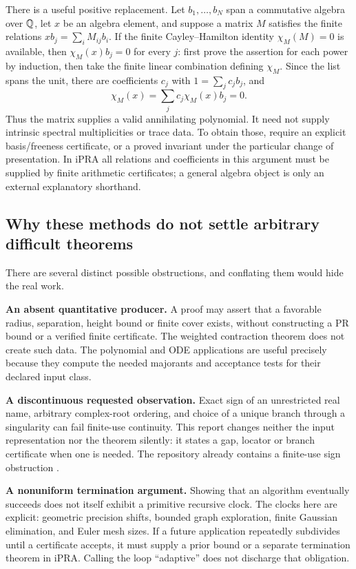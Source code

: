 There is a useful positive replacement. Let \(b_1,\ldots,b_N\) span a commutative algebra over \(\mathbb Q\), let \(x\) be an algebra element, and suppose a matrix \(M\) satisfies the finite relations
\(xb_j=\sum_iM_{ij}b_i\). If the finite Cayley--Hamilton identity
\(\chi_M(M)=0\) is available, then \(\chi_M(x)b_j=0\) for every \(j\): first prove the assertion for each power by induction, then take the finite linear combination defining \(\chi_M\). Since the list spans the unit, there are coefficients \(c_j\) with \(1=\sum_jc_jb_j\), and
\[
 \chi_M(x)=\sum_j c_j\chi_M(x)b_j=0.
\]
Thus the matrix supplies a valid annihilating polynomial. It need not supply intrinsic spectral multiplicities or trace data. To obtain those, require an explicit basis/freeness certificate, or a proved invariant under the particular change of presentation. In iPRA all relations and coefficients in this argument must be supplied by finite arithmetic certificates; a general algebra object is only an external explanatory shorthand.

\subsection{Why these methods do not settle arbitrary difficult theorems}

There are several distinct possible obstructions, and conflating them would hide the real work.

\textbf{An absent quantitative producer.} A proof may assert that a favorable radius, separation, height bound or finite cover exists, without constructing a PR bound or a verified finite certificate. The weighted contraction theorem does not create such data. The polynomial and ODE applications are useful precisely because they compute the needed majorants and acceptance tests for their declared input class.

\textbf{A discontinuous requested observation.} Exact sign of an unrestricted real name, arbitrary complex-root ordering, and choice of a unique branch through a singularity can fail finite-use continuity. This report changes neither the input representation nor the theorem silently: it states a gap, locator or branch certificate when one is needed. The repository already contains a finite-use sign obstruction \cite{repo-sign}.

\textbf{A nonuniform termination argument.} Showing that an algorithm eventually succeeds does not itself exhibit a primitive recursive clock. The clocks here are explicit: geometric precision shifts, bounded graph exploration, finite Gaussian elimination, and Euler mesh sizes. If a future application repeatedly subdivides until a certificate accepts, it must supply a prior bound or a separate termination theorem in iPRA. Calling the loop ``adaptive'' does not discharge that obligation.

